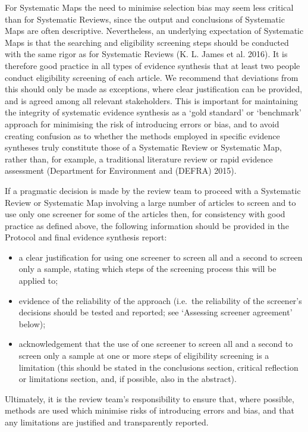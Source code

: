 \documentclass[
  letterpaper,
  DIV=11,
  numbers=noendperiod]{scrreprt}
\providecommand{\tightlist}{%
  \setlength{\itemsep}{0pt}\setlength{\parskip}{0pt}}
\begin{document}
For Systematic Maps the need to minimise selection bias may seem less
critical than for Systematic Reviews, since the output and conclusions
of Systematic Maps are often descriptive. Nevertheless, an underlying
expectation of Systematic Maps is that the searching and eligibility
screening steps should be conducted with the same rigor as for
Systematic Reviews (K. L. James et al. 2016). It is therefore good
practice in all types of evidence synthesis that at least two people
conduct eligibility screening of each article. We recommend that
deviations from this should only be made as exceptions, where clear
justification can be provided, and is agreed among all relevant
stakeholders. This is important for maintaining the integrity of
systematic evidence synthesis as a `gold standard' or `benchmark'
approach for minimising the risk of introducing errors or bias, and to
avoid creating confusion as to whether the methods employed in specific
evidence syntheses truly constitute those of a Systematic Review or
Systematic Map, rather than, for example, a traditional literature
review or rapid evidence assessment (Department for Environment and
(DEFRA) 2015).

If a pragmatic decision is made by the review team to proceed with a
Systematic Review or Systematic Map involving a large number of articles
to screen and to use only one screener for some of the articles then,
for consistency with good practice as defined above, the following
information should be provided in the Protocol and final evidence
synthesis report:

\begin{itemize}
\tightlist
\item
  a clear justification for using one screener to screen all and a
  second to screen only a sample, stating which steps of the screening
  process this will be applied to;
\item
  evidence of the reliability of the approach (i.e.~the reliability of
  the screener's decisions should be tested and reported; see `Assessing
  screener agreement' below);
\item
  acknowledgement that the use of one screener to screen all and a
  second to screen only a sample at one or more steps of eligibility
  screening is a limitation (this should be stated in the conclusions
  section, critical reflection or limitations section, and, if possible,
  also in the abstract).
\end{itemize}

Ultimately, it is the review team's responsibility to ensure that, where
possible, methods are used which minimise risks of introducing errors
and bias, and that any limitations are justified and transparently
reported.
\end{document}
